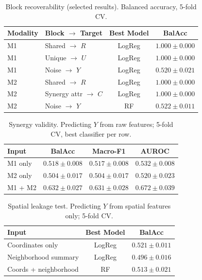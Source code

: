 \documentclass{article}
\theoremstyle{plain}
\theoremstyle{definition}
\begin{document}
\begin{table}[!ht]
\centering
\caption{Block recoverability (selected results). Balanced accuracy, 5-fold CV.}
\label{tab:sim-phase1-block}
\small
\begin{tabular}{llcc}
\toprule
Modality & Block $\to$ Target & Best Model & BalAcc \\
\midrule
M1   & Shared $\to$ $R$       & LogReg & $1.000 \pm 0.000$ \\
M1   & Unique $\to$ $U$       & LogReg & $1.000 \pm 0.000$ \\
M1   & Noise $\to$ $Y$        & LogReg & $0.520 \pm 0.021$ \\
M2   & Shared $\to$ $R$       & LogReg & $1.000 \pm 0.000$ \\
M2   & Synergy attr $\to$ $C$ & LogReg & $1.000 \pm 0.000$ \\
M2   & Noise $\to$ $Y$        & RF     & $0.522 \pm 0.011$ \\
\bottomrule
\end{tabular}
\end{table}

\begin{table}[!ht]
\centering
\caption{Synergy validity. Predicting $Y$ from raw features; 5-fold CV, best classifier per row.}
\label{tab:sim-phase1-synergy}
\small
\begin{tabular}{lccc}
\toprule
Input & BalAcc & Macro-F1 & AUROC \\
\midrule
M1 only       & $0.518 \pm 0.008$ & $0.517 \pm 0.008$ & $0.532 \pm 0.008$ \\
M2 only       & $0.504 \pm 0.017$ & $0.504 \pm 0.017$ & $0.520 \pm 0.023$ \\
M1 + M2       & $\mathbf{0.632 \pm 0.027}$ & $\mathbf{0.631 \pm 0.028}$ & $\mathbf{0.672 \pm 0.039}$ \\
\bottomrule
\end{tabular}
\end{table}

\begin{table}[!ht]
\centering
\caption{Spatial leakage test. Predicting $Y$ from spatial features only; 5-fold CV.}
\label{tab:sim-phase1-spatial}
\small
\begin{tabular}{lcc}
\toprule
Input & Best Model & BalAcc \\
\midrule
Coordinates only          & LogReg & $0.521 \pm 0.011$ \\
Neighborhood summary      & LogReg & $0.496 \pm 0.016$ \\
Coords + neighborhood     & RF     & $0.513 \pm 0.021$ \\
\bottomrule
\end{tabular}
\end{table}
\end{document}
